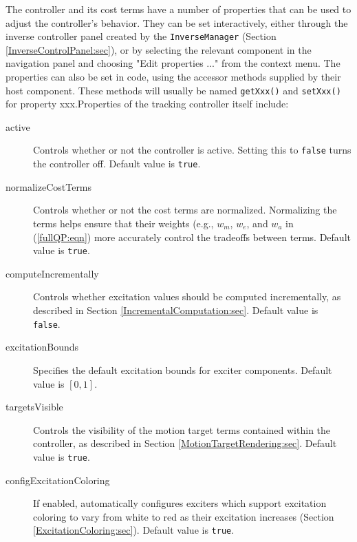 The controller and its cost terms have a number of properties that can be used
to adjust the controller's behavior. They can be set interactively,
either through the inverse
controller panel created by the {\tt InverseManager} (Section
\ref{InverseControlPanel:sec}), or 
by selecting the relevant component in the navigation panel and choosing {\sf
"Edit properties ..."} from the context menu. The properties can also be set
in code, using the accessor methods supplied by their host component.  These
methods will usually be named {\tt getXxx()} and {\tt setXxx()} for
property {\sf xxx}.Properties of the tracking controller itself include:

\begin{description}

\item[active]\mbox{}

Controls whether or not the controller is active. Setting this to {\tt false}
turns the controller off. Default value is {\tt true}.

\item[normalizeCostTerms]\mbox{}

Controls whether or not the cost terms are normalized. Normalizing the terms
helps ensure that their weights (e.g., $w_m$, $w_e$, and $w_a$ in
(\ref{fullQP:eqn}) more accurately control the tradeoffs between terms.
Default value is {\tt true}.

\item[computeIncrementally]\mbox{}

Controls whether excitation values should be computed incrementally, as
described in Section \ref{IncrementalComputation:sec}.  Default value is {\tt
false}.

\item[excitationBounds]\mbox{}

Specifies the default excitation bounds for exciter components.  Default value
is $[0, 1]$.

\item[targetsVisible]\mbox{}

Controls the visibility of the motion target terms contained within the
controller, as described in Section \ref{MotionTargetRendering:sec}. Default
value is {\tt true}.

\item[configExcitationColoring]\mbox{}

If enabled, automatically configures exciters which support excitation coloring
to vary from white to red as their excitation increases
(Section \ref{ExcitationColoring:sec}). Default value is {\tt true}.


\end{description}
